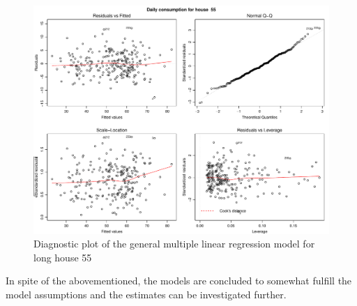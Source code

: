 \begin{figure}
    \centering
    \includegraphics[width=1.\textwidth]{../../../figures/general_lm55L.pdf}
    \caption{Diagnostic plot of the general multiple linear regression model for long house 55}
    \label{fig: general_lm55L}
\end{figure}
\noindent In spite of the abovementioned, the models are concluded to somewhat fulfill the model assumptions and the estimates can be investigated further. 

